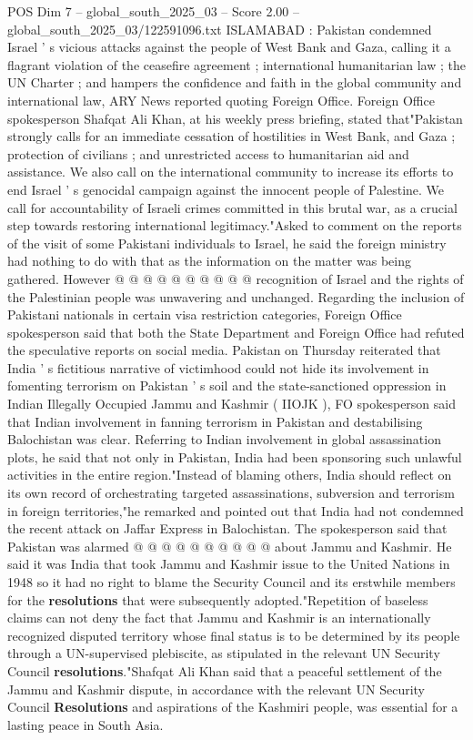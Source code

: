 \begin{textsample}{POS Dim 7 – global\_south\_2025\_03 – Score 2.00 – global\_south\_2025\_03/122591096.txt}  \label{ex:f7_pos_090}
ISLAMABAD : Pakistan condemned Israel ' s vicious attacks against the people of West Bank and Gaza, calling it a flagrant violation of the ceasefire agreement ; international humanitarian law ; the UN Charter ; and hampers the confidence and faith in the global community and international law, ARY News reported quoting Foreign Office.
Foreign Office spokesperson Shafqat Ali Khan, at his weekly press briefing, stated that"Pakistan strongly calls for an immediate cessation of hostilities in West Bank, and Gaza ; protection of civilians ; and unrestricted access to humanitarian aid and assistance.
We also call on the international community to increase its efforts to end Israel ' s genocidal campaign against the innocent people of Palestine.
We call for accountability of Israeli crimes committed in this brutal war, as a crucial step towards restoring international legitimacy."Asked to comment on the reports of the visit of some Pakistani individuals to Israel, he said the foreign ministry had nothing to do with that as the information on the matter was being gathered.
However @ @ @ @ @ @ @ @ @ @ recognition of Israel and the rights of the Palestinian people was unwavering and unchanged.
Regarding the inclusion of Pakistani nationals in certain visa restriction categories, Foreign Office spokesperson said that both the State Department and Foreign Office had refuted the speculative reports on social media.
Pakistan on Thursday reiterated that India ' s fictitious narrative of victimhood could not hide its involvement in fomenting terrorism on Pakistan ' s soil and the state-sanctioned oppression in Indian Illegally Occupied Jammu and Kashmir ( IIOJK ), FO spokesperson said that Indian involvement in fanning terrorism in Pakistan and destabilising Balochistan was clear.
Referring to Indian involvement in global assassination plots, he said that not only in Pakistan, India had been sponsoring such unlawful activities in the entire region."Instead of blaming others, India should reflect on its own record of orchestrating targeted assassinations, subversion and terrorism in foreign territories,"he remarked and pointed out that India had not condemned the recent attack on Jaffar Express in Balochistan.
The spokesperson said that Pakistan was alarmed @ @ @ @ @ @ @ @ @ @ about Jammu and Kashmir.
He said it was India that took Jammu and Kashmir issue to the United Nations in 1948 so it had no right to blame the Security Council and its erstwhile members for the \textbf{resolutions} that were subsequently adopted."Repetition of baseless claims can not deny the fact that Jammu and Kashmir is an internationally recognized disputed territory whose final status is to be determined by its people through a UN-supervised plebiscite, as stipulated in the relevant UN Security Council \textbf{resolutions}."Shafqat Ali Khan said that a peaceful settlement of the Jammu and Kashmir dispute, in accordance with the relevant UN Security Council \textbf{Resolutions} and aspirations of the Kashmiri people, was essential for a lasting peace in South Asia.

\end{textsample}
